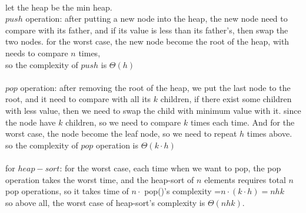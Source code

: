 \begin{parts}
    \begin{solution}
    \\let the heap be the min heap.\\
	$push$ operation: after putting a new node into the heap, the new node need to compare with its father,
	and if its value is less than its father's, then swap the two nodes.
	for the worst case, the new node become the root of the heap, with needs to compare $n$ times,\\
	so the complexity of $push$ is $\Theta(h)$\\
	\\
	$pop$ operation: after removing the root of the heap, we put the last node to the root, and it need to compare with all its $k$ children,
	if there exist some children with less value, then we need to swap the child with minimum value with it.
	since the node have $k$ children, so we need to compare $k$ times each time. And for the worst case, the node 
	become the leaf node, so we need to repeat $h$ times above.\\
	so the complexity of $pop$ operation is $\Theta(k\cdot h)$\\
	\\
	for $heap-sort$: for the worst case, each time when we want to pop,
	the pop operation takes the worst time, and the heap-sort of $n$ elements
	requires total $n$ pop operations, so it takes time of $n\cdot$ pop()'s complexity
	=$n\cdot(k\cdot h)=nhk$\\
	so above all, the worst case of heap-sort's complexity is $\Theta(nhk)$.
  \end{solution}
 

\end{parts}
